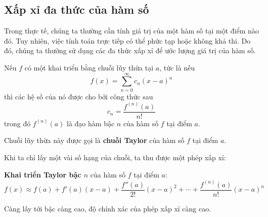 \subsection{Xấp xỉ đa thức của hàm số}
Trong thực tế, chúng ta thường cần tính giá trị của một hàm số tại một điểm nào đó. Tuy nhiên, việc tính toán trực tiếp có thể phức tạp hoặc không khả thi. Do đó, chúng ta thường sử dụng các đa thức xấp xỉ để ước lượng giá trị của hàm số.
\begin{theorem}\label{thm:taylor}
Nếu \(f\) có một khai triển bằng chuỗi lũy thừa tại \(a\), tức là nếu
\begin{equation}
f(x)=\sum_{n=0}^{\infty}c_n(x-a)^n
\end{equation}
thì các hệ số của nó được cho bởi công thức sau
\begin{equation}
c_n=\frac{f^{(n)}(a)}{n!}
\end{equation}
trong đó \(f^{(n)}(a)\) là đạo hàm bậc \(n\) của hàm số \(f\) tại điểm \(a\).

Chuỗi lũy thừa này được gọi là \textbf{chuỗi Taylor} của hàm số \(f\) tại điểm \(a\).
\end{theorem}
Khi ta chỉ lấy một vài số hạng của chuỗi, ta thu được một phép xấp xỉ:
\begin{definition}
\textbf{Khai triển Taylor bậc \(n\)} của hàm số \(f\) tại điểm \(a\):
\begin{equation}
f(x)\approx f(a)+f'(a)(x-a)+\frac{f''(a)}{2!}(x-a)^2+\cdots+\frac{f^{(n)}(a)}{n!}(x-a)^n
\end{equation}
\end{definition}
Càng lấy tới bậc càng cao, độ chính xác của phép xấp xỉ càng cao.